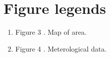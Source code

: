 \section{Figure legends}\label{figure-legends}


\begin{enumerate}
\def\labelenumi{(\arabic{enumi})}
\setcounter{enumi}{2}
\item
  Figure 3 . Map of area.
\item
  Figure 4 . Meterological data.
\end{enumerate}
